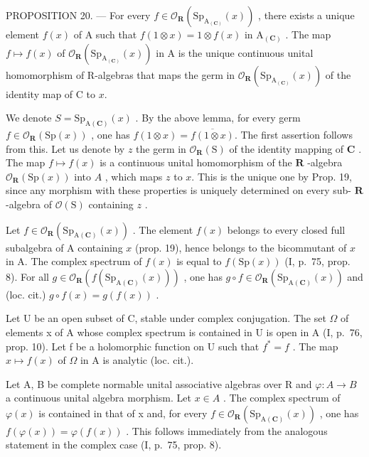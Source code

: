 PROPOSITION 20. --- For every \(f \in \mathcal{O}_{\mathbf{R}}(\mathrm{Sp}_{\mathrm{A}_{(\mathbf{C})}}(x))\) , there exists a unique element \(f(x)\) of A such that \(f(1 \otimes x) = 1 \otimes f(x)\) in \(\mathrm{A}_{(\mathbf{C})}\) . The map \(f \mapsto f(x)\) of \(\mathcal{O}_{\mathbf{R}}(\mathrm{Sp}_{\mathrm{A}_{(\mathbf{C})}}(x))\) in A is the unique continuous unital homomorphism of R-algebras that maps the germ in \(\mathcal{O}_{\mathbf{R}}(\mathrm{Sp}_{\mathrm{A}_{(\mathbf{C})}}(x))\) of the identity map of C to \(x\).

We denote \(S = \text{Sp}_{\text{A}(\mathbf{C})}(x)\) . By the above lemma, for every germ \(f \in \mathcal{O}_{\mathbf{R}}(\text{Sp}(x))\) , one has \(f(1 \otimes x) = \overline{f(1 \otimes x)}\). The first assertion follows from this. Let us denote by \(z\) the germ in \(\mathcal{O}_{\mathbf{R}}(\text{S})\) of the identity mapping of \(\mathbf{C}\) . The map \(f \mapsto f(x)\) is a continuous unital homomorphism of the \(\mathbf{R}\) -algebra \(\mathcal{O}_{\mathbf{R}}(\text{Sp}(x))\) into \(A\) , which maps \(z\) to \(x\). This is the unique one by Prop. 19, since any morphism with these properties is uniquely determined on every sub- \(\mathbf{R}\) -algebra of \(\mathcal{O}(\text{S})\) containing \(z\) .

Let \(f \in \mathcal{O}_{\mathbf{R}}(\mathrm{Sp}_{\mathrm{A}(\mathbf{C})}(x))\) . The element \(f(x)\) belongs to every closed full subalgebra of A containing \(x\) (prop. 19), hence belongs to the bicommutant of \(x\) in A. The complex spectrum of \(f(x)\) is equal to \(f(\mathrm{Sp}(x))\) (I, p.~75, prop. 8). For all \(g \in \mathcal{O}_{\mathbf{R}}(f(\mathrm{Sp}_{\mathrm{A}(\mathbf{C})}(x)))\) , one has \(g \circ f \in \mathcal{O}_{\mathbf{R}}(\mathrm{Sp}_{\mathrm{A}(\mathbf{C})}(x))\) and (loc. cit.) \(g \circ f(x) = g(f(x))\) .

Let U be an open subset of C, stable under complex conjugation. The set \(\Omega\) of elements x of A whose complex spectrum is contained in U is open in A (I, p.~76, prop. 10). Let f be a holomorphic function on U such that \(f^{*} = f\) . The map \(x \mapsto f(x)\) of \(\Omega\) in A is analytic (loc. cit.).

Let A, B be complete normable unital associative algebras over R and \(\varphi\colon A\to B\) a continuous unital algebra morphism. Let \(x\in A\) . The complex spectrum of \(\varphi(x)\) is contained in that of x and, for every \(f\in\mathcal{O}_{\mathbf{R}}(\mathrm{Sp}_{\mathrm{A}(\mathbf{C})}(x))\) , one has \(f(\varphi(x))=\varphi(f(x))\) . This follows immediately from the analogous statement in the complex case (I, p.~75, prop. 8).

